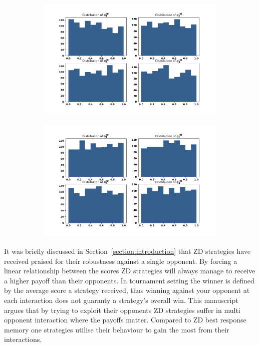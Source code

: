\documentclass[10pt]{article}
\begin{document}
\begin{figure}[!htbp]
    \begin{subfigure}{0.49\textwidth}
        \centering
        \includegraphics[width=\linewidth]{img/first_opponent_probabilities.pdf}
        \label{fig:first_opponents_probabilities}
    \end{subfigure}
    \begin{subfigure}{0.49\textwidth}
        \centering
        \includegraphics[width=\linewidth]{img/second_opponent_probabilities.pdf}
        \label{fig:second_opponents_probabilities}
    \end{subfigure}
\end{figure}

It was briefly discussed in Section~\ref{section:introduction} that ZD strategies
have received praised for their robustness against a single opponent. By forcing
a linear relationship between the scores ZD strategies will always manage to
receive a higher payoff than their opponents. In tournament setting the winner
is defined by the average score a strategy received, thus winning against your
opponent at each interaction does not guaranty a strategy's overall win.
This manuscript argues that by trying to exploit their opponents ZD strategies suffer in
multi opponent interaction where the payoffs matter. Compared to ZD best response
memory one strategies utilise their behaviour to gain the most from their interactions.
\end{document}
